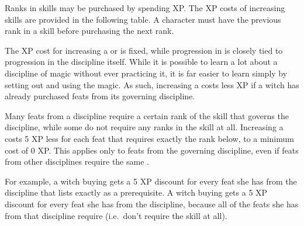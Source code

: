 Ranks in skills may be purchased by spending XP.
The XP costs of increasing skills are provided in the following table.
A character must have the previous rank in a skill before purchasing the next rank.


The XP cost for increasing a {\generalskill} or {\specialityskill} is fixed, while progression in {\disciplineskills} is closely tied to progression in the discipline itself.
While it is possible to learn a lot about a discipline of magic without ever practicing it, it is far easier to learn simply by setting out and using the magic.
As such, increasing a {\disciplineskill} costs less XP if a witch has already purchased feats from its governing discipline.

Many feats from a discipline require a certain rank of the skill that governs the discipline, while some do not require any ranks in the skill at all.
Increasing a {\disciplineskill} costs 5 XP less for each feat that requires exactly the rank below, to a minimum cost of 0 XP.
This applies only to feats from the governing discipline, even if feats from other disciplines require the same {\disciplineskill}.

For example, a witch buying  gets a 5 XP discount for every feat she has from the  discipline that lists exactly  as a prerequisite.
A witch buying  gets a 5 XP discount for every feat she has from the  discipline, because all of the feats she has from that discipline require  (i.e.\ don't require the  skill at all).

